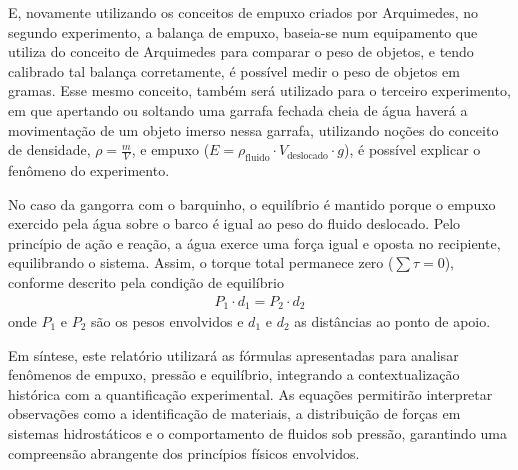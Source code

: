 E, novamente utilizando os conceitos de empuxo criados por Arquimedes, no
segundo experimento, a balança de empuxo, baseia-se num equipamento que utiliza
do conceito de Arquimedes para comparar o peso de objetos, e tendo calibrado tal
balança corretamente, é possível medir o peso de objetos em gramas. Esse mesmo
conceito, também será utilizado para o terceiro experimento, em que apertando ou
soltando uma garrafa fechada cheia de água haverá a movimentação de um objeto
imerso nessa garrafa, utilizando noções do conceito de densidade, $\rho =
\frac{m}{V}$, e empuxo ($E = \rho_{\text{fluido}} \cdot V_{\text{deslocado}}
\cdot g$)\cite{nussenzveig2014}, é possível explicar o fenômeno do
experimento.

No caso da gangorra com o barquinho, o equilíbrio é mantido porque o empuxo
exercido pela água sobre o barco é igual ao peso do fluido deslocado. Pelo
princípio de ação e reação, a água exerce uma força igual e oposta no
recipiente, equilibrando o sistema\cite{nussenzveig2014}. Assim, o torque total
permanece zero ($\sum \tau = 0$), conforme descrito pela condição de equilíbrio
\begin{align*}
	P_1 \cdot d_1 = P_2 \cdot d_2 
\end{align*}
onde $P_1$ e $P_2$ são os pesos envolvidos e $d_1$ e $d_2$ as distâncias ao
ponto de apoio.

Em síntese, este relatório utilizará as fórmulas apresentadas para analisar
fenômenos de empuxo, pressão e equilíbrio, integrando a contextualização
histórica com a quantificação experimental. As equações permitirão interpretar
observações como a identificação de materiais, a distribuição de forças em
sistemas hidrostáticos e o comportamento de fluidos sob pressão, garantindo uma
compreensão abrangente dos princípios físicos envolvidos.


